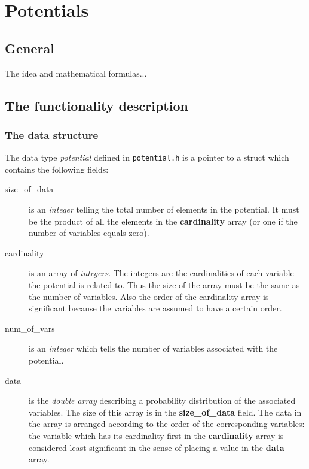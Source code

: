 \documentclass[12pt,a4paper]{report}
\begin{document}
\newpage
\section{Potentials}
\subsection{General}

The idea and mathematical formulas...


\subsection{The functionality description}
\subsubsection{The data structure}
The data type {\it potential} defined in \verb+potential.h+ is a
pointer to a struct which contains the following fields:
\begin{description}
\item[size\_of\_data] is an {\it integer} telling the total number of 
elements in the potential. It must be the product of all the elements 
in the \textbf{cardinality} array (or one if the number of variables 
equals zero).
\item[cardinality] is an array of {\it integers}. The integers are the
cardinalities of each variable the potential is related to. Thus the
size of the array must be the same as the number of variables. Also
the order of the cardinality array is significant because the
variables are assumed to have a certain order.
\item[num\_of\_vars] is an {\it integer} which tells the number of variables
associated with the potential.
\item[data] is the {\it double array} describing a probability
distribution of the associated variables. The size of this array is in
the \textbf{size\_of\_data} field. The data in the array is arranged
according to the order of the corresponding variables: the variable
which has its cardinality first in the \textbf{cardinality} array is
considered least significant in the sense of placing a value in the
\textbf{data} array. 

\end{description}
\end{document}
